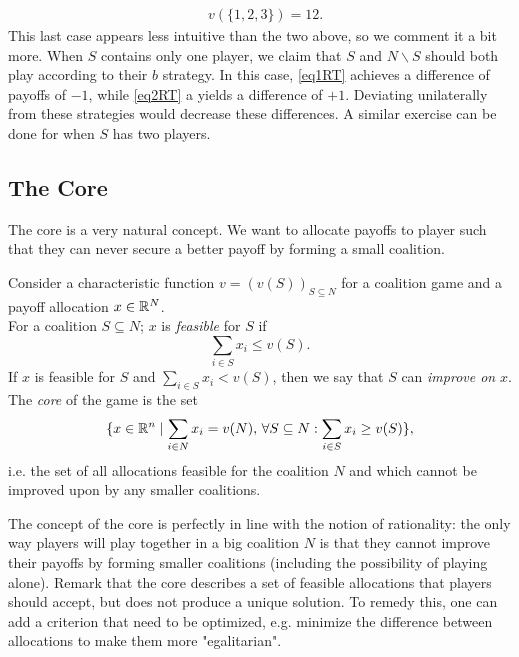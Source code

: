 \begin{example}
\begin{itemize}
$$\begin{aligned}
&v(\{1,2,3\}) = 12.
\end{aligned}
$$
This last case appears less intuitive than the two above, so we comment it a bit more.
When $S$ contains only one player, we claim that $S$ and $N \backslash S$ should both play according to their $b$ strategy. In this case, \eqref{eq1RT} achieves a difference of payoffs of $-1$, while \eqref{eq2RT} a yields a difference of $+1$. Deviating unilaterally from these strategies would decrease these differences. A similar exercise can be done for when $S$ has two players.
\end{itemize}
\end{example}



\subsection{The Core}

The core is a very natural concept. We want to allocate payoffs to player such that they can never secure a better payoff by forming a small coalition.
\begin{definition}
Consider a characteristic function $v = (v(S))_{S \subseteq N}$ for a coalition game and a payoff allocation $x \in \mathbb{R}^N$.\\
 For a coalition $S \subseteq N$; $x$ is \emph{feasible} for $S$ if $$\sum_{i \in S} x_i \leq v(S).$$
If $x$ is feasible for $S$ and $\sum_{i \in S} x_i < v(S)$, then we say that $S$ can \emph{improve on} $x$.\\
The \emph{core} of the game is the set
$$ \{x \in \mathbb{R}^n \mid \sum_{i \in N} x_i = v(N), \, \forall S \subseteq N:  \sum_{i \in S} x_i \geq v(S)\}, $$
i.e. the set of all allocations feasible for the coalition $N$ and which cannot be improved upon by any smaller coalitions.
\end{definition}

The concept of the core is perfectly in line with the notion of rationality: the only way players will play together in a big coalition $N$ is that they cannot improve their payoffs by forming smaller coalitions (including the possibility of playing alone).
Remark that the core describes a set of feasible allocations that players should accept, but does not produce a unique solution. To remedy this, one can add a criterion that need to be optimized, e.g. minimize the difference between allocations to make them more "egalitarian".

